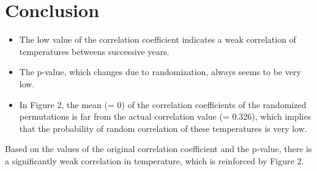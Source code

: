 \documentclass[12pt]{article}
\begin{document}
    \section{Conclusion}
    \begin{itemize}
        \item The low value of the correlation coefficient indicates a weak correlation of temperatures betweens successive years.
        \item The p-value, which changes due to randomization, always seems to be very low.
        \item In Figure 2, the mean (= 0) of the correlation coefficients of the randomized permutations is far from the actual correlation value (= 0.326), which implies that the probability of random correlation of these temperatures is very low.
    \end{itemize}

    Based on the values of the original correlation coefficient and the p-value, there is a significantly weak correlation in temperature, which is reinforced by Figure 2.
\end{document}
